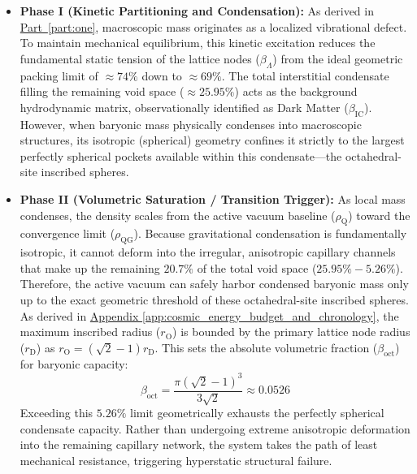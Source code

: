 \begin{itemize}
    \item \textbf{Phase I (Kinetic Partitioning and Condensation):} As derived in \hyperref[part:one]{Part~\ref{part:one}}, macroscopic mass originates as a localized vibrational defect. To maintain mechanical equilibrium, this kinetic excitation reduces the fundamental static tension of the lattice nodes ($\beta_{\Lambda}$) from the ideal geometric packing limit of $\approx 74\%$ down to $\approx 69\%$. The total interstitial condensate filling the remaining void space ($\approx 25.95\%$) acts as the background hydrodynamic matrix, observationally identified as Dark Matter ($\beta_{\mathrm{IC}}$). However, when baryonic mass physically condenses into macroscopic structures, its isotropic (spherical) geometry confines it strictly to the largest perfectly spherical pockets available within this condensate---the octahedral-site inscribed spheres.
    
    \item \textbf{Phase II (Volumetric Saturation / Transition Trigger):} As local mass condenses, the density scales from the active vacuum baseline ($\rho_{\mathrm{Q}}$) toward the convergence limit ($\rho_{\mathrm{QG}}$). Because gravitational condensation is fundamentally isotropic, it cannot deform into the irregular, anisotropic capillary channels that make up the remaining $20.7\%$ of the total void space ($25.95\% - 5.26\%$). Therefore, the active vacuum can safely harbor condensed baryonic mass only up to the exact geometric threshold of these octahedral-site inscribed spheres. As derived in \hyperref[app:cosmic_energy_budget_and_chronology]{Appendix \ref*{app:cosmic_energy_budget_and_chronology}}, the maximum inscribed radius ($r_{\mathrm{O}}$) is bounded by the primary lattice node radius ($r_{\mathrm{D}}$) as $r_{\mathrm{O}} = (\sqrt{2}-1)r_{\mathrm{D}}$. This sets the absolute volumetric fraction ($\beta_{\mathrm{oct}}$) for baryonic capacity:
    \begin{equation}
        \beta_{\mathrm{oct}} = \frac{\pi(\sqrt{2}-1)^3}{3\sqrt{2}} \approx 0.0526
    \end{equation}
    Exceeding this $5.26\%$ limit geometrically exhausts the perfectly spherical condensate capacity. Rather than undergoing extreme anisotropic deformation into the remaining capillary network, the system takes the path of least mechanical resistance, triggering hyperstatic structural failure.
    

\end{itemize}
